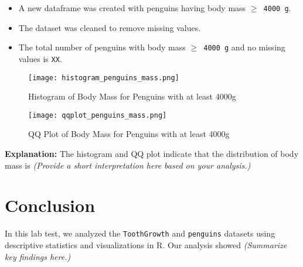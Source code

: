 \documentclass{article}
\begin{document}
\begin{itemize}
    \item A new dataframe was created with penguins having body mass \texttt{$\geq$ 4000 g}.
    \item The dataset was cleaned to remove missing values.
    \item The total number of penguins with body mass \texttt{$\geq$ 4000 g} and no missing values is \texttt{XX}.
\end{itemize}

\begin{figure}[H]
    \centering
    \texttt{[image: histogram\_penguins\_mass.png]} %
    \caption{Histogram of Body Mass for Penguins with at least 4000g}
    \label{fig:histogram_penguins_mass}
\end{figure}

\begin{figure}[H]
    \centering
    \texttt{[image: qqplot\_penguins\_mass.png]} %
    \caption{QQ Plot of Body Mass for Penguins with at least 4000g}
    \label{fig:qqplot_penguins_mass}
\end{figure}

\textbf{Explanation:} The histogram and QQ plot indicate that the distribution of body mass is \textit{(Provide a short interpretation here based on your analysis.)}

\section{Conclusion}
In this lab test, we analyzed the \texttt{ToothGrowth} and \texttt{penguins} datasets using descriptive statistics and visualizations in R. Our analysis showed \textit{(Summarize key findings here.)}
\end{document}
